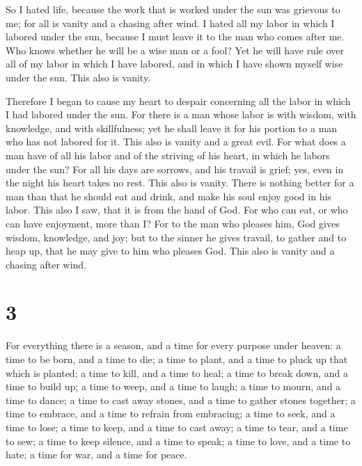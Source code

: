  So I hated life, because the work that is worked under
the sun was grievous to me; for all is vanity and a chasing after wind.
 I hated all my labor in which I labored under the sun,
because I must leave it to the man who comes after me. 
Who knows whether he will be a wise man or a fool? Yet he will have rule
over all of my labor in which I have labored, and in which I have shown
myself wise under the sun. This also is vanity.

 Therefore I began to cause my heart to despair
concerning all the labor in which I had labored under the sun.
 For there is a man whose labor is with wisdom, with
knowledge, and with skillfulness; yet he shall leave it for his portion
to a man who has not labored for it. This also is vanity and a great
evil.  For what does a man have of all his labor and of
the striving of his heart, in which he labors under the sun?
 For all his days are sorrows, and his travail is grief;
yes, even in the night his heart takes no rest. This also is vanity.
 There is nothing better for a man than that he should
eat and drink, and make his soul enjoy good in his labor. This also I
saw, that it is from the hand of God.  For who can eat,
or who can have enjoyment, more than I?  For to the man
who pleases him, God gives wisdom, knowledge, and joy; but to the sinner
he gives travail, to gather and to heap up, that he may give to him who
pleases God. This also is vanity and a chasing after wind.

\hypertarget{section-2}{%
\section{3}\label{section-2}}

 For everything there is a season, and a time for every
purpose under heaven:  a time to be born, and a time to
die; a time to plant, and a time to pluck up that which is planted;
 a time to kill, and a time to heal; a time to break down,
and a time to build up;  a time to weep, and a time to
laugh; a time to mourn, and a time to dance;  a time to
cast away stones, and a time to gather stones together; a time to
embrace, and a time to refrain from embracing;  a time to
seek, and a time to lose; a time to keep, and a time to cast away;
 a time to tear, and a time to sew; a time to keep
silence, and a time to speak;  a time to love, and a time
to hate; a time for war, and a time for peace.

